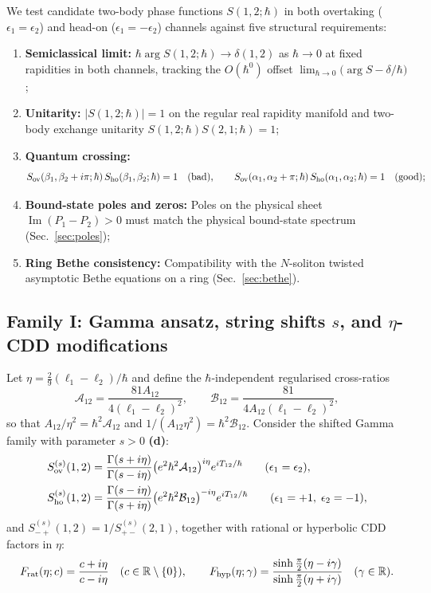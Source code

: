 \documentclass[11pt,a4paper]{article}
\newcommand{\Ld}{\textsf{\textbf{(d)}}}
\newcommand{\cA}{\mathcal{A}}
\newcommand{\cB}{\mathcal{B}}
\theoremstyle{remark}
\begin{document}
We test candidate two-body phase functions $S(1,2;\hbar)$ in both overtaking ($\epsilon_1=\epsilon_2$) and head-on ($\epsilon_1=-\epsilon_2$) channels against five structural requirements:
\begin{enumerate}
\item[(i)] \textbf{Semiclassical limit:} $\hbar\arg S(1,2;\hbar)\to\delta(1,2)$ as $\hbar\to 0$ at fixed rapidities in both channels, tracking the $O(\hbar^0)$ offset $\lim_{\hbar\to 0}\bigl(\arg S-\delta/\hbar\bigr)$;
\item[(ii)] \textbf{Unitarity:} $|S(1,2;\hbar)|=1$ on the regular real rapidity manifold and two-body exchange unitarity $S(1,2;\hbar)S(2,1;\hbar)=1$;
\item[(iii)] \textbf{Quantum crossing:}
\begin{equation}\label{eq:q_crossing}
S_{\rm ov}(\beta_1,\beta_2+i\pi;\hbar)\,S_{\rm ho}(\beta_1,\beta_2;\hbar)=1\quad(\text{bad}),\qquad
S_{\rm ov}(\alpha_1,\alpha_2+\pi;\hbar)\,S_{\rm ho}(\alpha_1,\alpha_2;\hbar)=1\quad(\text{good});
\end{equation}
\item[(iv)] \textbf{Bound-state poles and zeros:} Poles on the physical sheet $\operatorname{Im}(P_1-P_2)>0$ must match the physical bound-state spectrum (Sec.~\ref{sec:poles});
\item[(v)] \textbf{Ring Bethe consistency:} Compatibility with the $N$-soliton twisted asymptotic Bethe equations on a ring (Sec.~\ref{sec:bethe}).
\end{enumerate}

\subsection{Family I: Gamma ansatz, string shifts \texorpdfstring{$s$}{s}, and \texorpdfstring{$\eta$}{eta}-CDD modifications}
Let $\eta=\frac29(\ell_1-\ell_2)/\hbar$ and define the $\hbar$-independent regularised cross-ratios
\begin{equation}\label{eq:calAB}
\cA_{12}=\frac{81 A_{12}}{4(\ell_1-\ell_2)^2},\qquad
\cB_{12}=\frac{81}{4 A_{12}(\ell_1-\ell_2)^2},
\end{equation}
so that $A_{12}/\eta^2=\hbar^2\cA_{12}$ and $1/(A_{12}\eta^2)=\hbar^2\cB_{12}$. Consider the shifted Gamma family with parameter $s>0$ \Ld:
\begin{align}
S_{\rm ov}^{(s)}(1,2)&=\frac{\Gamma(s+i\eta)}{\Gamma(s-i\eta)}\bigl(e^2\hbar^2\cA_{12}\bigr)^{i\eta}e^{iT_{12}/\hbar}
\qquad(\epsilon_1=\epsilon_2),\label{eq:S_gamma_ov}\\
S_{\rm ho}^{(s)}(1,2)&=\frac{\Gamma(s-i\eta)}{\Gamma(s+i\eta)}\bigl(e^2\hbar^2\cB_{12}\bigr)^{-i\eta}e^{iT_{12}/\hbar}
\qquad(\epsilon_1=+1,\;\epsilon_2=-1),\label{eq:S_gamma_ho}
\end{align}
and $S_{-+}^{(s)}(1,2)=1/S_{+-}^{(s)}(2,1)$, together with rational or hyperbolic CDD factors in $\eta$:
\begin{equation}\label{eq:eta_CDD}
F_{\rm rat}(\eta;c)=\frac{c+i\eta}{c-i\eta}\quad(c\in\mathbb R\setminus\{0\}),\qquad
F_{\rm hyp}(\eta;\gamma)=\frac{\sinh\frac\pi2(\eta-i\gamma)}{\sinh\frac\pi2(\eta+i\gamma)}\quad(\gamma\in\mathbb R).
\end{equation}
\end{document}
